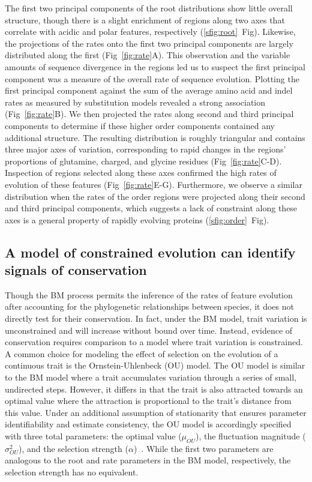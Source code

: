 The first two principal components of the root distributions show little overall structure, though there is a slight enrichment of regions along two axes that correlate with acidic and polar features, respectively (\ref{sfig:root}~Fig). Likewise, the projections of the rates onto the first two principal components are largely distributed along the first (Fig~\ref{fig:rate}A). This observation and the variable amounts of sequence divergence in the regions led us to suspect the first principal component was a measure of the overall rate of sequence evolution. Plotting the first principal component against the sum of the average amino acid and indel rates as measured by substitution models revealed a strong association (Fig~\ref{fig:rate}B). We then projected the rates along second and third principal components to determine if these higher order components contained any additional structure. The resulting distribution is roughly triangular and contains three major axes of variation, corresponding to rapid changes in the regions' proportions of glutamine, charged, and glycine residues (Fig~\ref{fig:rate}C-D). Inspection of regions selected along these axes confirmed the high rates of evolution of these features (Fig~\ref{fig:rate}E-G). Furthermore, we observe a similar distribution when the rates of the order regions were projected along their second and third principal components, which suggests a lack of constraint along these axes is a general property of rapidly evolving proteins (\ref{sfig:order}~Fig).

\subsection{A model of constrained evolution can identify signals of conservation}
Though the BM process permits the inference of the rates of feature evolution after accounting for the phylogenetic relationships between species, it does not directly test for their conservation. In fact, under the BM model, trait variation is unconstrained and will increase without bound over time. Instead, evidence of conservation requires comparison to a model where trait variation is constrained. A common choice for modeling the effect of selection on the evolution of a continuous trait is the Ornstein-Uhlenbeck (OU) model. The OU model is similar to the BM model where a trait accumulates variation through a series of small, undirected steps. However, it differs in that the trait is also attracted towards an optimal value where the attraction is proportional to the trait's distance from this value. Under an additional assumption of stationarity that ensures parameter identifiability and estimate consistency, the OU model is accordingly specified with three total parameters: the optimal value ($\mu_{OU}$), the fluctuation magnitude ($\sigma^2_{OU}$), and the selection strength ($\alpha$)~\cite{Ho2013, Ho2014}. While the first two parameters are analogous to the root and rate parameters in the BM model, respectively, the selection strength has no equivalent.

